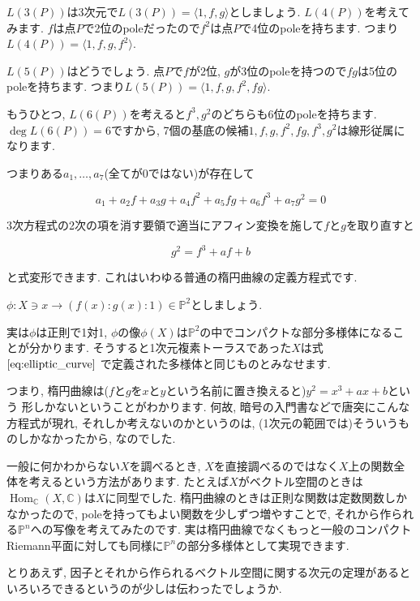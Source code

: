 \documentclass{jsarticle}
\newcommand{\CC}{\mathbb{C}}
\newcommand{\PP}{\mathbb{P}}
\newcommand{\makeop}[1]{\mathop{\mathrm{#1}}\nolimits}
\def\Hom{\makeop{Hom}}
\theoremstyle{definition}
\numberwithin{theorem}{section}
\begin{document}
$L(3(P))$は3次元で$L(3(P)) = \langle1, f, g\rangle$としましょう. $L(4(P))$を考えてみます. $f$は点$P$で2位のpoleだったので$f^2$は点$P$で4位のpoleを持ちます. つまり$L(4(P)) = \langle1, f, g, f^2\rangle$.

$L(5(P))$はどうでしょう. 点$P$で$f$が2位, $g$が3位のpoleを持つので$fg$は5位のpoleを持ちます. つまり$L(5(P)) = \langle1, f, g, f^2, fg\rangle$.

もうひとつ, $L(6(P))$を考えると$f^3, g^2$のどちらも6位のpoleを持ちます. $\deg L(6(P)) = 6$ですから, 7個の基底の候補$1, f, g, f^2, fg, f^3, g^2$は線形従属になります.

つまりある$a_1, \ldots, a_7$(全てが0ではない)が存在して

\begin{equation*}
a_1 + a_2f + a_3g + a_4f^2+a_5fg+a_6f^3+a_7g^2 = 0
\end{equation*}

3次方程式の2次の項を消す要領で適当にアフィン変換を施して$f$と$g$を取り直すと

\begin{equation}
\label{eq:elliptic_curve}
g^2 = f^3 + af + b
\end{equation}

と式変形できます. これはいわゆる普通の楕円曲線の定義方程式です.

$\phi: X \ni x \rightarrow (f(x):g(x):1) \in \PP^2$としましょう.

実は$\phi$は正則で1対1, $\phi$の像$\phi(X)$は$\PP^2$の中でコンパクトな部分多様体になることが分かります. そうすると1次元複素トーラスであった$X$は式 $\ref{eq:elliptic_curve}$ で定義された多様体と同じものとみなせます.

つまり, 楕円曲線は($f$と$g$を$x$と$y$という名前に置き換えると)$y^2 = x^3+ax+b$という
形しかないということがわかります. 何故, 暗号の入門書などで唐突にこんな方程式が現れ, それしか考えないのかというのは, (1次元の範囲では)そういうものしかなかったから, なのでした.

一般に何かわからない$X$を調べるとき, $X$を直接調べるのではなく$X$上の関数全体を考えるという方法があります. たとえば$X$がベクトル空間のときは$\Hom_\CC(X, \CC)$は$X$に同型でした. 楕円曲線のときは正則な関数は定数関数しかなかったので, poleを持ってもよい関数を少しずつ増やすことで, それから作られる$\PP^n$への写像を考えてみたのです. 実は楕円曲線でなくもっと一般のコンパクトRiemann平面に対しても同様に$\PP^n$の部分多様体として実現できます.

とりあえず, 因子とそれから作られるベクトル空間に関する次元の定理があるといろいろできるというのが少しは伝わったでしょうか.
\end{document}
